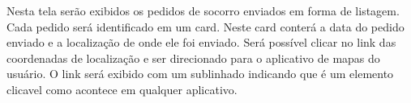 Nesta tela serão exibidos os pedidos de socorro enviados em forma de listagem. Cada pedido será identificado em um card. Neste card conterá a data do pedido enviado e a localização de onde ele foi enviado. Será possível clicar no link das coordenadas de localização e ser direcionado para o aplicativo de mapas do usuário. O link será exibido com um sublinhado indicando que é um elemento clicavel como acontece em qualquer aplicativo.
